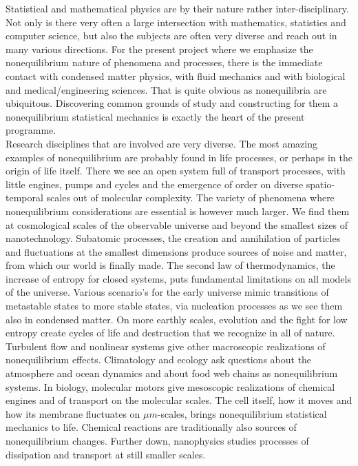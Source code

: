 Statistical and mathematical physics are by their nature rather inter-disciplinary.  Not only is there very often a large intersection with mathematics, statistics and computer science, but also the subjects are often very diverse and reach out in many various directions.  For the present project where we emphasize the nonequilibrium nature of phenomena and processes, there is the immediate contact with condensed matter physics, with fluid mechanics and with biological and medical/engineering sciences.  That is quite obvious as nonequilibria are ubiquitous.  Discovering common grounds of study and constructing for them a nonequilibrium statistical mechanics is exactly the heart of the present programme.\\
Research disciplines that are involved are very diverse. The most amazing examples of nonequilibrium are probably found in life processes, or perhaps in the origin of life itself.  There we see an open system full of transport processes, with little engines, pumps and cycles and the emergence of order on diverse spatio-temporal scales out of molecular complexity. The variety of phenomena where nonequilibrium considerations are essential is however much larger.  We find them at cosmological scales of the observable universe  and beyond the smallest sizes of nanotechnology.  Subatomic processes, the creation and annihilation of particles and fluctuations at the smallest dimensions produce sources of noise and matter, from which our world is finally made.  The second law of thermodynamics, the increase of entropy for closed systems, puts fundamental limitations on all models of the universe.  Various scenario's for the early universe  mimic transitions of metastable states to more   stable states, via
 nucleation processes as we see them also  in condensed matter.  On more earthly scales, evolution and the fight for low entropy create cycles of life and destruction that we recognize in all of nature.    Turbulent
  flow and nonlinear systems give other macroscopic realizations of nonequilibrium effects.   Climatology and ecology ask questions about the atmosphere and ocean dynamics and about food web chains as  nonequilibrium systems.
  In biology, molecular motors   give mesoscopic realizations of chemical engines and of transport on the molecular scales.   The cell itself, how it moves and how its membrane fluctuates on $\mu m$-scales, brings nonequilibrium statistical mechanics to life.   Chemical reactions are traditionally also sources of nonequilibrium changes.
 Further down, nanophysics studies processes of dissipation and transport at still smaller scales.




